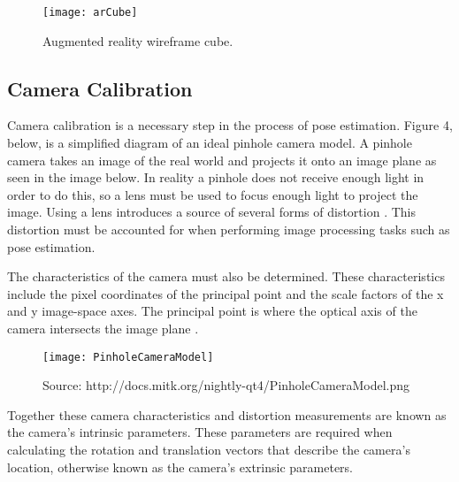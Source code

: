 \documentclass{article}
\begin{document}
\begin{figure}[H]
\begin{center}
\texttt{[image: arCube]} 
\caption{Augmented reality wireframe cube.}
\end{center}
\end{figure}

\subsection{Camera Calibration}

Camera calibration is a necessary step in the process of pose estimation. Figure 4, below, is a simplified diagram of an ideal pinhole camera model. A pinhole camera takes an image of the real world and projects it onto an image plane \cite{pinhole} as seen in the image below. In reality a pinhole does not receive enough light in order to do this, so a lens must be used to focus enough light to project the image. Using a lens introduces a source of several forms of distortion \cite{calib1}. This distortion must be accounted for when performing image processing tasks such as pose estimation. \par

The characteristics of the camera must also be determined. These characteristics include the pixel coordinates of the principal point and the scale factors of the x and y image-space axes. The principal point is where the optical axis of the camera intersects the image plane \cite{wikicalib}.

\vspace*{2\baselineskip}

\begin{figure}[H]
\begin{center}
\texttt{[image: PinholeCameraModel]}
\caption{Source: http://docs.mitk.org/nightly-qt4/PinholeCameraModel.png}
\end{center}
\end{figure}

Together these camera characteristics and distortion measurements are known as the camera's intrinsic parameters. These parameters are required when calculating the rotation and translation vectors that describe the camera's location, otherwise known as the camera's extrinsic parameters. \par
\end{document}
